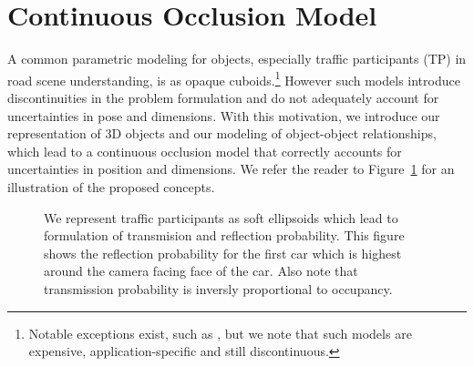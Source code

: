 \section{Continuous Occlusion Model}
\label{sec:setup}



\def\TP{TP}
A common parametric modeling for objects, especially traffic participants (TP) in road scene understanding, is as opaque cuboids.\footnote{Notable exceptions exist, such as \cite{Zia_etal_2014}, but we note that such models are expensive, application-specific and still discontinuous.} However such models introduce discontinuities in the problem formulation and do not adequately account for uncertainties in pose and dimensions. With this motivation, we introduce our representation of 3D objects and our modeling of object-object relationships, which lead to a continuous occlusion model that correctly accounts for uncertainties in position and dimensions. We refer the reader to Figure~\ref{fig:reflectiontransimission} for an illustration of the proposed concepts.


\begin{figure}
  \usetikzlibrary{calc}
  \centering
  \begin{tikzpicture}
    
  \end{tikzpicture}
  \caption{We represent traffic participants as soft ellipsoids which lead to formulation of transmision and reflection probability. This figure shows the reflection probability for the first car which is highest around the camera facing face of the car. Also note that transmission probability is inversly proportional to occupancy.}
  \label{fig:reflectiontransimission}
\end{figure}

